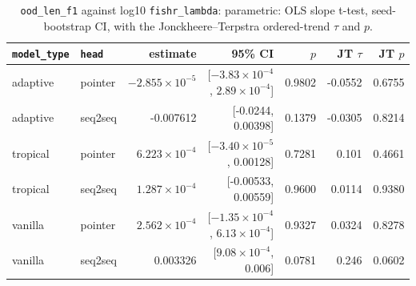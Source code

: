 \documentclass[10pt]{article}
\begin{document}
{\small
\begin{longtable}{llrrrrr}
\caption{\texttt{ood\_len\_f1} against log10 \texttt{fishr\_lambda}: parametric: OLS slope t-test, seed-bootstrap CI, with the Jonckheere--Terpstra ordered-trend $\tau$ and $p$.}\label{tab:trend-ood_len_f1}\\
\toprule
\texttt{model\_type} & \texttt{head} & estimate & 95\% CI & $p$ & JT $\tau$ & JT $p$\\
\midrule
\endhead
adaptive & pointer & $-2.855\times10^{-5}$ & [$-3.83\times10^{-4}$, $2.89\times10^{-4}$] & 0.9802 & -0.0552 & 0.6755\\
adaptive & seq2seq & -0.007612 & [-0.0244, 0.00398] & 0.1379 & -0.0305 & 0.8214\\
tropical & pointer & $6.223\times10^{-4}$ & [$-3.40\times10^{-5}$, 0.00128] & 0.7281 & 0.101 & 0.4661\\
tropical & seq2seq & $1.287\times10^{-4}$ & [-0.00533, 0.00559] & 0.9600 & 0.0114 & 0.9380\\
vanilla & pointer & $2.562\times10^{-4}$ & [$-1.35\times10^{-4}$, $6.13\times10^{-4}$] & 0.9327 & 0.0324 & 0.8278\\
vanilla & seq2seq & 0.003326 & [$9.08\times10^{-4}$, 0.006] & 0.0781 & 0.246 & 0.0602\\
\bottomrule
\end{longtable}
}
\end{document}
